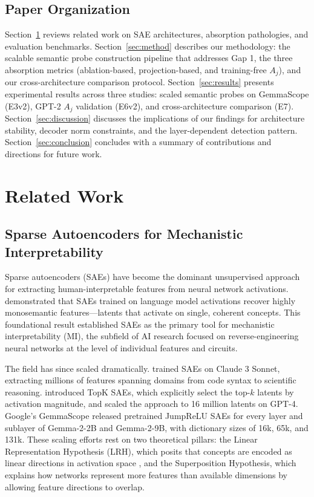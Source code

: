 \documentclass{article}
\begin{document}
\subsection{Paper Organization}

Section~\ref{sec:related} reviews related work on SAE architectures, absorption pathologies, and evaluation benchmarks. Section~\ref{sec:method} describes our methodology: the scalable semantic probe construction pipeline that addresses Gap 1, the three absorption metrics (ablation-based, projection-based, and training-free $A_j$), and our cross-architecture comparison protocol. Section~\ref{sec:results} presents experimental results across three studies: scaled semantic probes on GemmaScope (E3v2), GPT-2 $A_j$ validation (E6v2), and cross-architecture comparison (E7). Section~\ref{sec:discussion} discusses the implications of our findings for architecture stability, decoder norm constraints, and the layer-dependent detection pattern. Section~\ref{sec:conclusion} concludes with a summary of contributions and directions for future work.

\section{Related Work}
\label{sec:related}

\subsection{Sparse Autoencoders for Mechanistic Interpretability}

Sparse autoencoders (SAEs) have become the dominant unsupervised approach for extracting human-interpretable features from neural network activations. \citet{cunningham2023sparse} demonstrated that SAEs trained on language model activations recover highly monosemantic features---latents that activate on single, coherent concepts. This foundational result established SAEs as the primary tool for mechanistic interpretability (MI), the subfield of AI research focused on reverse-engineering neural networks at the level of individual features and circuits.

The field has since scaled dramatically. \citet{templeton2024scaling} trained SAEs on Claude 3 Sonnet, extracting millions of features spanning domains from code syntax to scientific reasoning. \citet{gao2024scaling} introduced TopK SAEs, which explicitly select the top-$k$ latents by activation magnitude, and scaled the approach to 16 million latents on GPT-4. Google's GemmaScope \citep{lieberum2024gemmascope} released pretrained JumpReLU SAEs for every layer and sublayer of Gemma-2-2B and Gemma-2-9B, with dictionary sizes of 16k, 65k, and 131k. These scaling efforts rest on two theoretical pillars: the Linear Representation Hypothesis (LRH), which posits that concepts are encoded as linear directions in activation space \citep{elhage2022superposition}, and the Superposition Hypothesis, which explains how networks represent more features than available dimensions by allowing feature directions to overlap.
\end{document}
